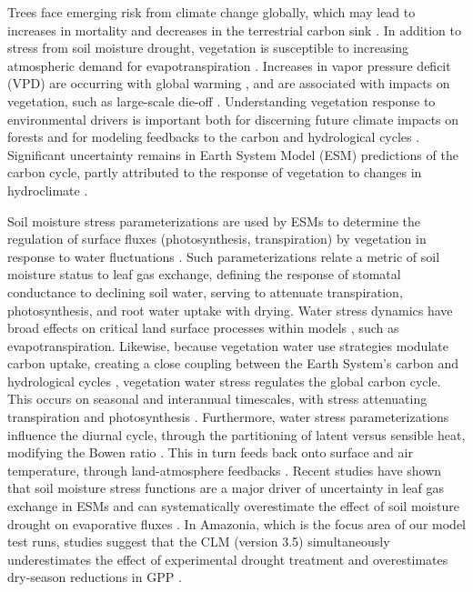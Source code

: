 \documentclass[draft,linenumbers]{agujournal}
\begin{document}
Trees face emerging risk from climate change globally, which may lead to increases in mortality and decreases in the terrestrial carbon sink \citep{allen2010,anderegg2013b,mcdowell2016}.
In addition to stress from soil moisture drought, vegetation is susceptible to increasing atmospheric demand for evapotranspiration \citep{restaino2016,novick2016b,lemordant2018}.
Increases in vapor pressure deficit (VPD) are occurring with global warming \citep{ficklin2017,seager2015}, and are associated with impacts on vegetation, such as large-scale die-off \citep{williams2013,mcdowell2015}.
Understanding vegetation response to environmental drivers is important both for discerning future climate impacts on forests and for modeling feedbacks to the carbon and hydrological cycles \citep{lemordant2018}.
Significant uncertainty remains in Earth System Model (ESM) predictions of the carbon cycle, partly attributed to the response of vegetation to changes in hydroclimate \citep{dekauwe2017,friedlingstein2014,trugman2018}.

Soil moisture stress parameterizations are used by ESMs to determine the regulation of surface fluxes (photosynthesis, transpiration) by vegetation in response to water fluctuations \citep{egea2011,verhoef2014}.
Such parameterizations relate a metric of soil moisture status to leaf gas exchange, defining the response of stomatal conductance to declining soil water, serving to attenuate transpiration, photosynthesis, and root water uptake with drying.
Water stress dynamics have broad effects on critical land surface processes within models \citep{joetzjer2014}, such as evapotranspiration.
Likewise, because vegetation water use strategies modulate carbon uptake, creating a close coupling between the Earth System's carbon and hydrological cycles \citep{green2017}, vegetation water stress regulates the global carbon cycle.
This occurs on seasonal and interannual timescales, with stress attenuating transpiration \citep{dekauwe2015} and photosynthesis \citep{stocker2018}.
Furthermore, water stress parameterizations influence the diurnal cycle, through the partitioning of latent versus sensible heat, modifying the Bowen ratio \citep{gentine2007,gentine2011}. 
This in turn feeds back onto surface and air temperature, through land-atmosphere feedbacks \citep{bonan2008,seneviratne2006}.
Recent studies have shown that soil moisture stress functions are a major driver of uncertainty in leaf gas exchange in ESMs \citep{trugman2018} and can systematically overestimate the effect of soil moisture drought on evaporative fluxes \citep{ukkola2016,bonan2014}.
In Amazonia, which is the focus area of our model test runs, studies suggest that the CLM (version 3.5) simultaneously underestimates the effect of experimental drought treatment \citep{powell2013} and overestimates dry-season reductions in GPP \citep{restrepo2017}.
\end{document}
